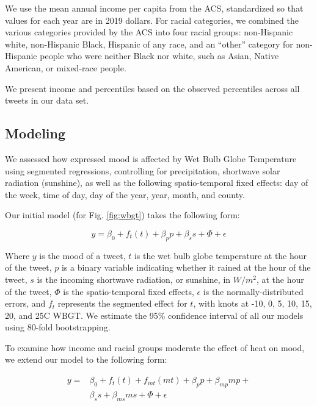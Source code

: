 \documentclass[9pt,twocolumn,twoside,lineno]{pnas-new}
\begin{document}
We use the mean annual income per capita from the ACS, standardized so that values for each year are in 2019 dollars. For racial categories, we combined the various categories provided by the ACS into four racial groups: non-Hispanic white, non-Hispanic Black, Hispanic of any race, and an ``other'' category for non-Hispanic people who were neither Black nor white, such as Asian, Native American, or mixed-race people.

We present income and percentiles based on the observed percentiles across all tweets in our data set.
 
\subsection*{Modeling}
We assessed how expressed mood is affected by Wet Bulb Globe Temperature using segmented regressions, controlling for precipitation, shortwave solar radiation (sunshine), as well as the following spatio-temporal fixed effects: day of the week, time of day, day of the year, year, month, and county. 

Our initial model (for Fig. \ref{fig:wbgt}) takes the following form:

\begin{equation}
 y = \beta_0 + f_t(t) + \beta_p p + \beta_s s + \Phi + \epsilon
 \label{mod:1}
\end{equation}

Where $y$ is the mood of a tweet, $t$ is the wet bulb globe temperature at the hour of the tweet, $p$ is a binary variable indicating whether it rained at the hour of the tweet, $s$ is the incoming shortwave radiation, or sunshine, in $W/m^2$, at the hour of the tweet, $\Phi$ is the spatio-temporal fixed effects, $\epsilon$ is the normally-distributed errors, and $f_t$ represents the segmented effect for $t$, with knots at -10\textdegree, 0\textdegree, 5\textdegree, 10\textdegree, 15\textdegree, 20\textdegree, and 25\textdegree C WBGT. We estimate the 95\% confidence interval of all our models using 80-fold bootstrapping. 

To examine how income and racial groups moderate the effect of heat on mood, we extend our model to the following form:

\begin{equation}
  \begin{align*}
    y = & \beta_0 + f_t(t) + f_{mt}(m t) + \beta_p p + \beta_{mp} m p + \\
       & \beta_s s + \beta_{ms} m s + \Phi + \epsilon
 \label{mod:2}
  \end{align*}
\end{equation}
\end{document}
